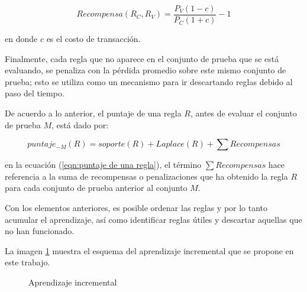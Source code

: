 \documentclass[12pt]{report}
\theoremstyle{break}
\theoremstyle{break}
\begin{document}
\begin{equation}\label{eqn:recompensa reglas}
Recompensa(R_C, R_V) = \dfrac{P_V (1 - c)}{P_C (1 + c) } - 1
\end{equation}

en donde $c$ es el costo de transacción.

Finalmente, cada regla que no aparece en el conjunto de prueba que se está evaluando, se penaliza con la pérdida promedio sobre este mismo conjunto de prueba; esto se utiliza como un mecanismo para ir descartando reglas debido al paso del tiempo.

De acuerdo a lo anterior, el puntaje de una regla $R$, antes de evaluar el conjunto de prueba $M$, está dado por:

\begin{equation} \label{eqn:puntaje de una regla}
puntaje_{-M}(R) = soporte(R) + Laplace(R) + \sum Recompensas
\end{equation}

en la ecuación (\ref{eqn:puntaje de una regla}), el término $ \sum Recompensas$ hace referencia a la suma de recompensas o penalizaciones que ha obtenido la regla $R$ para cada conjunto de prueba anterior al conjunto $M$.

Con los elementos anteriores, es posible ordenar las reglas y por lo tanto acumular el aprendizaje, así como identificar reglas útiles y descartar aquellas que no han funcionado.

La imagen \ref{imagen:aprendizaje_incremental} muestra el esquema del aprendizaje incremental que se propone en este trabajo.


\begin{figure}[ht]
\centering
{}
\caption{\label{imagen:aprendizaje_incremental} Aprendizaje incremental}
\end{figure}
\end{document}
